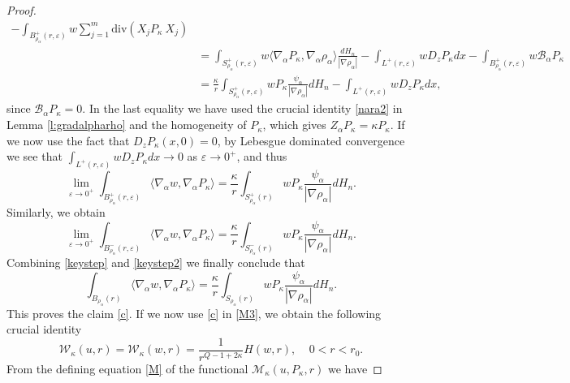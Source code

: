 \documentclass[11pt]{amsart}
\theoremstyle{plain}
\numberwithin{equation}{section}
\begin{document}
\begin{proof}
\begin{align*}
 -  \int_{{B^+_{\rho_\alpha}(r,{\varepsilon})}} w \sum_{j=1}^m \text{div}(X_j P_\kappa\ X_j)
\\
& =  \int_{{S^+_{\rho_\alpha}(r,{\varepsilon})}} w \langle{\nabla_\alpha} P_\kappa,{\nabla_\alpha} {\rho_\alpha}\rangle \frac{dH_{n}}{|\nabla {\rho_\alpha}|}  - \int_{{L^+(r,{\varepsilon})}} w  D_z P_\kappa dx -  \int_{{B^+_{\rho_\alpha}(r,{\varepsilon})}} w {\mathcal{B}_\alpha} P_\kappa
\\
& =  \frac{\kappa}{r}  \int_{{S^+_{\rho_\alpha}(r,{\varepsilon})}} w P_\kappa \frac{\psi_\alpha}{|\nabla {\rho_\alpha}|} dH_{n} - \int_{{L^+(r,{\varepsilon})}} w  D_z P_\kappa dx,
\end{align*}
since ${\mathcal{B}_\alpha} P_\kappa = 0$. In the last equality we have used the crucial identity \eqref{nara2} in Lemma \ref{l:gradalpharho} and the homogeneity of $P_\kappa$, which gives ${Z_\alpha} P_\kappa = \kappa P_\kappa$. If we now use the fact that $D_z P_\kappa(x,0) = 0$, by Lebesgue dominated convergence we see that $\int_{{L^+(r,{\varepsilon})}} w  D_z P_\kappa dx \to 0$ as ${\varepsilon} \to 0^+$, and thus
\begin{equation}\label{keystep}
\underset{{\varepsilon}\to 0^+}{\lim} \int_{{B^+_{\rho_\alpha}(r,{\varepsilon})}} \langle{\nabla_\alpha} w,{\nabla_\alpha} P_\kappa\rangle = \frac{\kappa}{r} \int_{{S^+_{\rho_\alpha}(r)}} w P_\kappa \frac{\psi_\alpha}{|\nabla {\rho_\alpha}|}dH_{n}.
\end{equation}
Similarly, we obtain
\begin{equation}\label{keystep2}
\underset{{\varepsilon}\to 0^+}{\lim} \int_{{B^-_{\rho_\alpha}(r,{\varepsilon})}} \langle{\nabla_\alpha} w,{\nabla_\alpha} P_\kappa\rangle = \frac{\kappa}{r} \int_{{S^-_{\rho_\alpha}(r)}} w P_\kappa \frac{\psi_\alpha}{|\nabla {\rho_\alpha}|}dH_{n}.
\end{equation}
Combining \eqref{keystep} and \eqref{keystep2} we finally conclude that
\[
\int_{{B_{\rho_\alpha}(r)}} \langle{\nabla_\alpha} w,{\nabla_\alpha} P_\kappa\rangle   = \frac{\kappa}{r} \int_{{S_{\rho_\alpha}(r)}} w P_\kappa \frac{\psi_\alpha}{|\nabla {\rho_\alpha}|}dH_{n}.
\]
This proves the claim \eqref{c}. If we now use \eqref{c} in \eqref{M3}, we obtain the following crucial identity
\begin{equation}\label{M5}
\mathcal W_\kappa(u,r)  = \mathcal W_\kappa(w,r)  = \frac{1}{r^{Q-1+2\kappa}} H(w,r),\ \ \ \ \ 0<r<r_0.
\end{equation}
From the defining equation  \eqref{M} of the functional $\mathcal M_\kappa(u,P_\kappa,r)$ we have

\end{proof}
\end{document}
